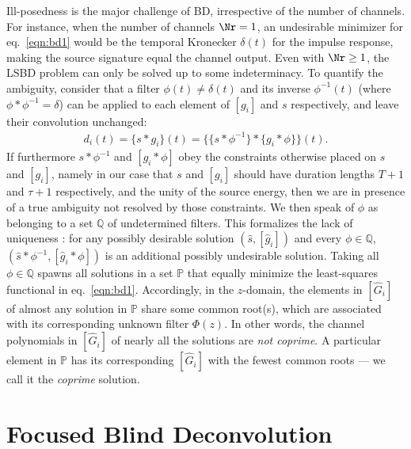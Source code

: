\documentclass{article}
\theoremstyle{definition}
\def\vecc#1{[#1]}
\begin{document}
{Ill-posedness is the major challenge of BD, 
irrespective of the number of channels.
%
For instance,
when the number of channels $\Nr=1$,
an undesirable minimizer for
eq.~\ref{eqn:bd1}
would be the temporal Kronecker $\delta(t)$ %
for the impulse response, 
making the source signature equal the channel output. 
%
Even with 
$\Nr\ge 1$, the LSBD problem 
can only be solved up to some indeterminacy.
%
To quantify the ambiguity, %
consider that a filter $\phi(t)\ne\delta(t)$
and its inverse 
$\phi^{-1}(t)$ ({where} $\phi \ast \phi^{-1} = \delta$)
can be applied to each element of 
$\vecc{g_i}$ and $s$ respectively, and leave their convolution unchanged:
\begin{eqnarray}
	d_{i}(t)=\{{s}\ast {g}_{i}\}(t)=\{\{{s}\ast\phi^{-1}\} \ast \{{g}_{i}\ast\phi\}\}(t){.}
	\label{eqn:decont2}
\end{eqnarray}
If furthermore ${s}\ast\phi^{-1}$ and $\vecc{{g}_{i}\ast\phi}$ obey the constraints otherwise 
placed on $s$ and $\vecc{g_i}$, namely in our case that 
$s$ and $\vecc{g_i}$ 
should have duration lengths $T+1$ and $\tau+1$ respectively, 
and the unity of the source energy,
then we are in 
presence of a true ambiguity not resolved by those constraints. 
%
We then speak of $\phi$ as belonging to a set $\mathbb{Q}$ of undetermined 
filters. 
%
This formalizes the lack of uniqueness \citep{xu1995least}: 
for any possibly desirable solution $(\hat{s}, \vecc{\hat{g}_i})$ 
and every $\phi\in\mathbb{Q}$,
$(\hat{s}\ast\phi^{-1}, \vecc{\hat{g}_{i}\ast\phi})$ 
is an additional {possibly} undesirable solution. 
%
Taking all $\phi\in\mathbb{Q}$ spawns all solutions in a set
$\mathbb{P}$ 
that equally minimize the 
least-squares functional in 
eq.~\ref{eqn:bd1}.
%
Accordingly, in the $z$-domain,
the elements in $\vecc{\hat{G}_i}$ of 
almost any solution
in $\mathbb{P}$
share some common root(s), which are
associated with its corresponding unknown filter $\Phi(z)$.
%
In other words, the channel polynomials in $\vecc{\hat{G}_i}$
of nearly all the solutions 
are \emph{not coprime}.
%
A particular element in $\mathbb{P}$ has 
its corresponding $\vecc{\hat{G}_i}$ with 
the fewest 
common roots ---
we call it the \emph{coprime} solution.
%
%


\section{Focused Blind Deconvolution}
\label{sec:fbd}
\medskip

}
\end{document}
